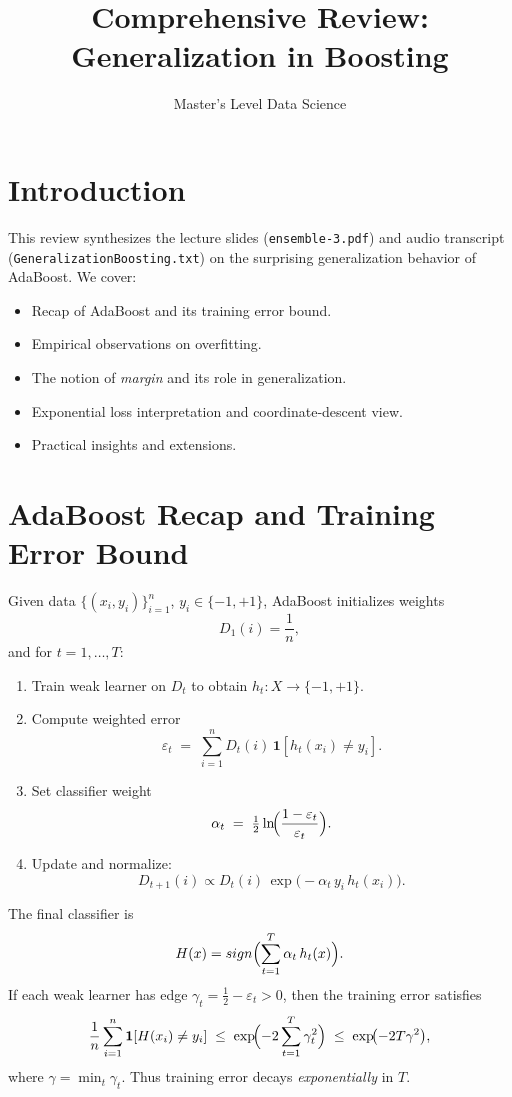 \documentclass[11pt]{article}
\title{Comprehensive Review: Generalization in Boosting}
\author{Master's Level Data Science}
\date{}
\begin{document}
\maketitle
\tableofcontents
\bigskip

\section{Introduction}
This review synthesizes the lecture slides (\texttt{ensemble-3.pdf}) and audio transcript (\texttt{GeneralizationBoosting.txt}) on the surprising generalization behavior of AdaBoost. We cover:
\begin{itemize}
  \item Recap of AdaBoost and its training error bound.
  \item Empirical observations on overfitting.
  \item The notion of \emph{margin} and its role in generalization.
  \item Exponential loss interpretation and coordinate‐descent view.
  \item Practical insights and extensions.
\end{itemize}

\section{AdaBoost Recap and Training Error Bound}
Given data $\{(x_i,y_i)\}_{i=1}^n$, $y_i\in\{-1,+1\}$, AdaBoost initializes weights
\[
  D_1(i)=\frac1n,
\]
and for $t=1,\dots,T$:
\begin{enumerate}
  \item Train weak learner on $D_t$ to obtain $h_t:X\to\{-1,+1\}$.
  \item Compute weighted error
  \[
    \varepsilon_t \;=\;\sum_{i=1}^n D_t(i)\,\mathbf{1}[h_t(x_i)\neq y_i].
  \]
  \item Set classifier weight
  \[
    \alpha_t \;=\;\tfrac12\ln\!\Bigl(\frac{1-\varepsilon_t}{\varepsilon_t}\Bigr).
  \]
  \item Update and normalize:
  \[
    D_{t+1}(i)\propto D_t(i)\,\exp\bigl(-\alpha_t\,y_i\,h_t(x_i)\bigr).
  \]
\end{enumerate}
The final classifier is
\[
  H(x)=sign\Bigl(\sum_{t=1}^T \alpha_t\,h_t(x)\Bigr).
\]
If each weak learner has edge $\gamma_t=\tfrac12-\varepsilon_t>0$, then the training error satisfies
\[
  \frac1n\sum_{i=1}^n\mathbf{1}[H(x_i)\neq y_i]
  \;\le\;\exp\!\Bigl(-2\sum_{t=1}^T\gamma_t^2\Bigr)
  \;\le\;\exp\!\bigl(-2T\gamma^2\bigr),
\]
where $\gamma=\min_t\gamma_t$. Thus training error decays \emph{exponentially} in $T$.
\end{document}
